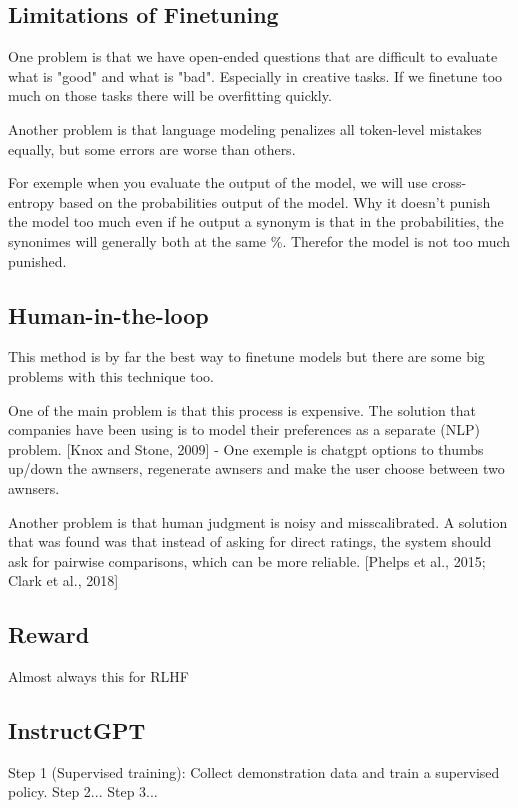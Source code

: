 \documentclass{article}
\begin{document}
\subsection{Limitations of Finetuning}

One problem is that we have open-ended questions that are difficult to evaluate what is "good" and what is "bad". Especially in creative tasks. If we finetune too much on those tasks there will be overfitting quickly.

Another problem is that language modeling penalizes all token-level mistakes equally, but some errors are worse than others.

For exemple when you evaluate the output of the model, we will use cross-entropy based on the probabilities output of the model. Why it doesn't punish the model too much even if he output a synonym is that in the probabilities, the synonimes will generally both at the same \%. Therefor the model is not too much punished.

\subsection{Human-in-the-loop}

This method is by far the best way to finetune models but there are some big problems with this technique too.

One of the main problem is that this process is expensive. The solution that companies have been using is to model their preferences as a separate (NLP) problem. [Knox and Stone, 2009]
- One exemple is chatgpt options to thumbs up/down the awnsers, regenerate awnsers and make the user choose between two awnsers.

Another problem is that human judgment is noisy and misscalibrated. A solution that was found was that instead of asking for direct ratings, the system should ask for pairwise comparisons, which can be more reliable. [Phelps et al., 2015; Clark et al., 2018]

\subsection{Reward }
Almost always this for RLHF

\subsection{InstructGPT}
Step 1 (Supervised training): Collect demonstration data and train a supervised policy.
Step 2... 
Step 3...
\end{document}
